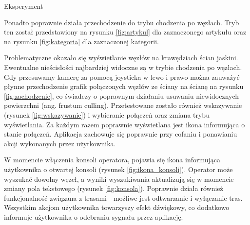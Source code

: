 \begin{chapter}{Eksperyment}


Ponadto poprawnie działa przechodzenie do trybu chodzenia po węzłach. Tryb ten został przedstawiony na rysunku \ref{fig:artykul} dla zaznaczonego artykułu oraz na rysunku \ref{fig:kategoria} dla zaznaczonej kategorii. 



Problematyczne okazało się wyświetlanie węzłów na krawędziach ścian jaskini. Ewentualne nieścisłości najbardziej widoczne są w trybie chodzenia po węzłach. Gdy przesuwamy kamerę za pomocą joysticka w lewo i prawo można zauważyć płynne przechodzenie grafik połączonych węzłów ze ściany na ścianę na rysunku \ref{fig:zachodzenie}, co świadczy o poprawnym działaniu usuwaniu niewidocznych powierzchni (ang. frustum culling). 
Przetestowane zostało również wskazywanie (rysunek \ref{fig:wskazywanie}) i wybieranie połączeń oraz zmiana trybu wyświetlania. Za każdym razem poprawnie wyświetlana jest ikona informująca o stanie połączeń. Aplikacja zachowuje się poprawnie przy cofaniu i ponawianiu akcji wykonanych przez użytkownika. 



W momencie włączenia konsoli operatora, pojawia się ikona informująca użytkownika o otwartej konsoli (rysunek \ref{fig:ikona_konsoli}). Operator może wyszukać dowolny węzeł, a wyniki wyszukiwania aktualizują się w momencie zmiany pola tekstowego (rysunek \ref{fig:konsola}). Poprawnie działa również funkcjonalność związana z trasami - możliwe jest odtwarzanie i wyłączanie tras. Wszystkim akcjom użytkownika towarzyszy efekt dźwiękowy, co dodatkowo informuje użytkownika o odebraniu sygnału przez aplikację.



\end{chapter}
